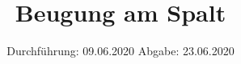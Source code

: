 

\subject{V406}
\title{Beugung am Spalt}
\date{%
  Durchführung: 09.06.2020
  \hspace{3em}
  Abgabe: 23.06.2020
}



\maketitle
\thispagestyle{empty}
\tableofcontents
\newpage







\printbibliography{}


